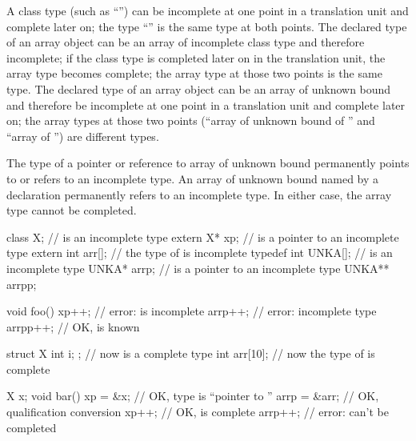 \pnum
A class type (such as ``'') can be incomplete at one
point in a translation unit and complete later on; the type
``'' is the same type at both points. The declared type
of an array object can be an array of incomplete class type and
therefore incomplete; if the class type is completed later on in the
translation unit, the array type becomes complete; the array type at
those two points is the same type. The declared type of an array object
can be an array of unknown bound and therefore be incomplete at one
point in a translation unit and complete later on; the array types at
those two points (``array of unknown bound of '' and ``array of
 '') are different types.
\begin{note}
The type of a pointer or reference to array of unknown bound
permanently points to or refers to an incomplete type.
An array of unknown bound named by a  declaration
permanently refers to an incomplete type.
In either case, the array type cannot be completed.
\end{note}
\begin{example}
%
\begin{codeblock}
class X;                        //  is an incomplete type
extern X* xp;                   //  is a pointer to an incomplete type
extern int arr[];               // the type of  is incomplete
typedef int UNKA[];             //  is an incomplete type
UNKA* arrp;                     //  is a pointer to an incomplete type
UNKA** arrpp;

void foo() {
  xp++;                         // error:  is incomplete
  arrp++;                       // error: incomplete type
  arrpp++;                      // OK,  is known
}

struct X { int i; };            // now  is a complete type
int arr[10];                    // now the type of  is complete

X x;
void bar() {
  xp = &x;                      // OK, type is ``pointer to ''
  arrp = &arr;                  // OK, qualification conversion
  xp++;                         // OK,  is complete
  arrp++;                       // error:  can't be completed
}
\end{codeblock}
\end{example}

